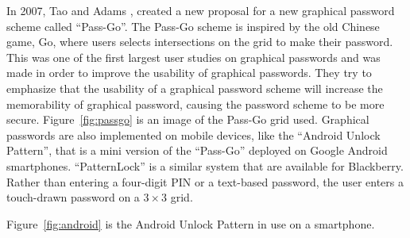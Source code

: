   \begin{figure}[H]
    \centering
  \end{figure}
  
  In 2007, Tao and Adams \cite{Tao}, created a new proposal for a new graphical password scheme called ``Pass-Go''. The Pass-Go scheme is inspired by the old Chinese game, Go, where users selects intersections on the grid to make their password. This was one of the first largest user studies on graphical passwords and was made in order to improve the usability of graphical passwords. They try to emphasize that the usability of a graphical password scheme will increase the memorability of graphical password, causing the password scheme to be more secure.
  Figure~\ref{fig:passgo} is an image of the Pass-Go grid used. 
  Graphical passwords are also implemented on mobile devices, like the ``Android Unlock Pattern'', that is a mini version of the ``Pass-Go'' deployed on Google Android smartphones. ``PatternLock'' is a similar system that are available for Blackberry. Rather than entering a four-digit PIN or a text-based password, the user enters a touch-drawn password on a $3\times3$ grid.

  Figure~\ref{fig:android} is the Android Unlock Pattern in use on a smartphone.

